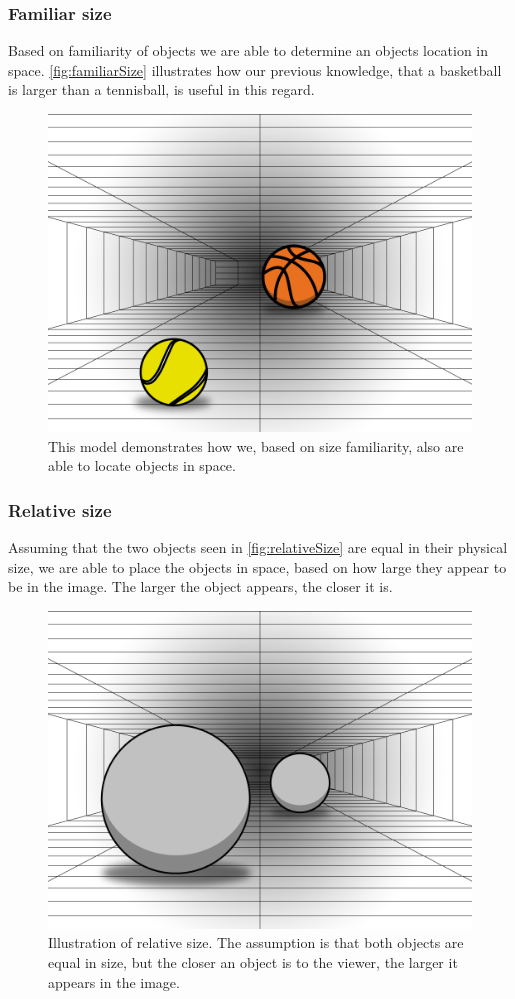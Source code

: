 \subsubsection{Familiar size}
Based on familiarity of objects we are able to determine an objects location in space. \autoref{fig:familiarSize} illustrates how our previous knowledge, that a basketball is larger than a tennisball, is useful in this regard.
\citep[p.~200]{sensationPerception}
\begin{figure}[H]
	\centering
	\includegraphics[width=0.75\linewidth]{figure/Analysis/familiarSize.png}
	\caption{This model demonstrates how we, based on size familiarity, also are able to locate objects in space.}
	\label{fig:familiarSize}
\end{figure}

\subsubsection{Relative size}
Assuming that the two objects seen in \autoref{fig:relativeSize} are equal in their physical size, we are able to place the objects in space, based on how large they appear to be in the image. The larger the object appears, the closer it is\citep[p.~200]{sensationPerception}.
\begin{figure}[H]
	\centering
	\includegraphics[width=0.75\linewidth]{figure/Analysis/relativeSize.png}
	\caption{Illustration of relative size. The assumption is that both objects are equal in size, but the closer an object is to the viewer, the larger it appears in the image.}
	\label{fig:relativeSize}
\end{figure}

